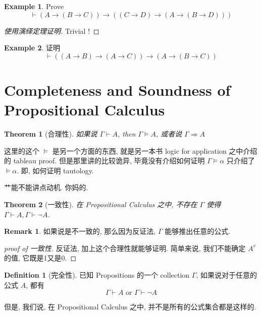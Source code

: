 \documentclass[12pt, a4paper]{ctexart} %
\theoremstyle{plain}
\newtheorem{theorem}{Theorem}[section]
\theoremstyle{definition}
\newtheorem{example}{Example}[section]
\newtheorem{definition}{Definition}[section]
\newtheorem*{remark}{Remark}
\newtheorem*{comment}{Comment}
\begin{document}
\begin{comment}
这个定理好用的一批, 只不过不让用. 
\end{comment}
\begin{example}
    Prove
    \begin{equation}
        \vdash \left(A \to \left(B \to C\right) \right) \to \left(\left(C \to D\right) \to \left(A \to \left(B\to D\right)\right)\right)
    \end{equation}
    \begin{proof}[使用演绎定理证明]
        Trivial !
    \end{proof}
\end{example}
\begin{example}
    证明
    \begin{equation}
    \vdash  \left( \left(A \to B \right) \to \left(A \to C\right) \right) \to \left(A \to \left( B \to C\right)\right)
    \end{equation}
\end{example}
\begin{comment}
    这个例子实际上是 A2 的逆命题. Wow, impressive.
\end{comment}
\section{Completeness and Soundness of Propositional Calculus}
\begin{theorem}[合理性]
    如果说 $\Gamma \vdash A$, then $\Gamma \vDash A$, 或者说 $\Gamma \Rightarrow A$
\end{theorem}
这里的这个 $\vDash$ 是另一个方面的东西, 就是另一本书 logic for application 之中介绍的 tableau proof. 
但是那里讲的比较诡异, 毕竟没有介绍如何证明 $\Gamma \vDash \alpha$ 只介绍了 $\vDash \alpha$. 即, 如何证明 
tautology. 

艹能不能讲点动机. 你妈的. 

\begin{theorem}[一致性]
在 Propositional Calculus 之中, 不存在 $\Gamma $ 使得 $\Gamma \vdash A , \Gamma \vdash  \neg A$.
\end{theorem}
\begin{remark}
    如果说是不一致的, 那么因为反证法,  $\Gamma$ 能够推出任意的公式.
\end{remark}
\begin{proof}[proof of 一致性]
    反证法, 加上这个合理性就能够证明. 简单来说, 我们不能确定 $A^{v}$ 的值, 它既是1又是0.    
\end{proof}
\begin{definition}[完全性]\label{def:complete}
    已知 Propositions 的一个 collection $\Gamma$, 如果说对于任意的公式 $A $, 都有 
    \begin{equation}
        \Gamma \vdash  A \text{ or } \Gamma \vdash \neg A
    \end{equation}
\end{definition}
但是, 我们说, 在 Propositional Calculus 之中, 并不是所有的公式集合都是这样的. 
\end{document}

